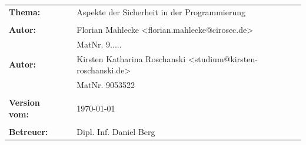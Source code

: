 \begin{verbatim}






\end{verbatim}
\begin{flushleft}
\begin{tabular}{llll}
\textbf{Thema:} & & Aspekte der Sicherheit in der Programmierung & \\
& & \\
\textbf{Autor:} & & Florian Mahlecke <florian.mahlecke@cirosec.de>& \\
& & MatNr. 9..... & \\
\textbf{Autor:} & & Kirsten Katharina Roschanski <studium@kirsten-roschanski.de>& \\
& & MatNr. 9053522 & \\
& & \\
\textbf{Version vom:} & & \today &\\
& & \\
\textbf{Betreuer:} & & Dipl. Inf. Daniel Berg &\\
\end{tabular}
\end{flushleft}
